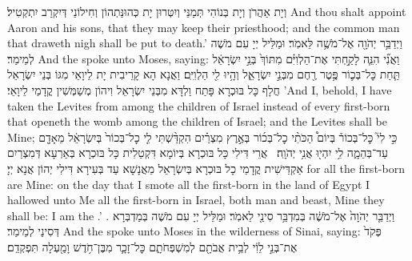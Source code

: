 {וְיָת אַהֲרֹן וְיָת בְּנוֹהִי תְּמַנֵּי וְיִטְּרוּן יָת כְּהוּנַּתְהוֹן וְחִילוֹנַי דְּיִקְרַב יִתְקְטִיל׃}
{And thou shalt appoint Aaron and his sons, that they may keep their priesthood; and the common man that draweth nigh shall be put to death.’}{}
{וַיְדַבֵּ֥ר יְהֹוָ֖ה אֶל־מֹשֶׁ֥ה לֵּאמֹֽר׃}
{וּמַלֵּיל יְיָ עִם מֹשֶׁה לְמֵימַר׃}
{And the \lord\space spoke unto Moses, saying:}{}
{וַאֲנִ֞י הִנֵּ֧ה לָקַ֣חְתִּי אֶת־הַלְוִיִּ֗ם מִתּוֹךְ֙ בְּנֵ֣י יִשְׂרָאֵ֔ל תַּ֧חַת כׇּל־בְּכ֛וֹר פֶּ֥טֶר רֶ֖חֶם מִבְּנֵ֣י יִשְׂרָאֵ֑ל וְהָ֥יוּ לִ֖י הַלְוִיִּֽם׃
}
{וַאֲנָא הָא קָרֵיבִית יָת לֵיוָאֵי מִגּוֹ בְּנֵי יִשְׂרָאֵל חֲלָף כָּל בּוּכְרָא פָּתַח וַלְדָּא מִבְּנֵי יִשְׂרָאֵל וִיהוֹן מְשַׁמְּשִׁין קֳדָמַי לֵיוָאֵי׃}
{’And I, behold, I have taken the Levites from among the children of Israel instead of every first-born that openeth the womb among the children of Israel; and the Levites shall be Mine;}{}
{כִּ֣י לִי֮ כׇּל־בְּכוֹר֒ בְּיוֹם֩ הַכֹּתִ֨י כׇל־בְּכ֜וֹר בְּאֶ֣רֶץ מִצְרַ֗יִם הִקְדַּ֨שְׁתִּי לִ֤י כׇל־בְּכוֹר֙ בְּיִשְׂרָאֵ֔ל מֵאָדָ֖ם עַד־בְּהֵמָ֑ה לִ֥י יִהְי֖וּ אֲנִ֥י יְהֹוָֽה׃ \petucha }
{אֲרֵי דִּילִי כָּל בּוּכְרָא בְּיוֹמָא דִּקְטַלִית כָּל בּוּכְרָא בְּאַרְעָא דְּמִצְרַיִם אַקְדֵּישִׁית קֳדָמַי כָל בּוּכְרָא בְּיִשְׂרָאֵל מֵאֲנָשָׁא עַד בְּעִירָא דִּילִי יְהוֹן אֲנָא יְיָ׃}
{for all the first-born are Mine: on the day that I smote all the first-born in the land of Egypt I hallowed unto Me all the first-born in Israel, both man and beast, Mine they shall be: I am the \lord.’ .}{}
{וַיְדַבֵּ֤ר יְהֹוָה֙ אֶל־מֹשֶׁ֔ה בְּמִדְבַּ֥ר סִינַ֖י לֵאמֹֽר׃}
{וּמַלֵּיל יְיָ עִם מֹשֶׁה בְּמַדְבְּרָא דְּסִינַי לְמֵימַר׃}
{And the \lord\space spoke unto Moses in the wilderness of Sinai, saying:}{}
{פְּקֹד֙ אֶת־בְּנֵ֣י לֵוִ֔י לְבֵ֥ית אֲבֹתָ֖ם לְמִשְׁפְּחֹתָ֑ם כׇּל־זָכָ֛ר מִבֶּן־חֹ֥דֶשׁ וָמַ֖עְלָה תִּפְקְדֵֽם׃
}
